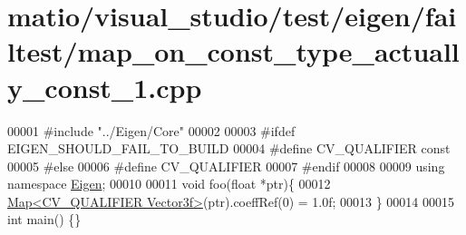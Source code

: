 \hypertarget{matio_2visual__studio_2test_2eigen_2failtest_2map__on__const__type__actually__const__1_8cpp_source}{}\section{matio/visual\+\_\+studio/test/eigen/failtest/map\+\_\+on\+\_\+const\+\_\+type\+\_\+actually\+\_\+const\+\_\+1.cpp}
\label{matio_2visual__studio_2test_2eigen_2failtest_2map__on__const__type__actually__const__1_8cpp_source}

\begin{DoxyCode}
00001 \textcolor{preprocessor}{#include "../Eigen/Core"}
00002 
00003 \textcolor{preprocessor}{#ifdef EIGEN\_SHOULD\_FAIL\_TO\_BUILD}
00004 \textcolor{preprocessor}{#define CV\_QUALIFIER const}
00005 \textcolor{preprocessor}{#else}
00006 \textcolor{preprocessor}{#define CV\_QUALIFIER}
00007 \textcolor{preprocessor}{#endif}
00008 
00009 \textcolor{keyword}{using namespace }\hyperlink{namespace_eigen}{Eigen};
00010 
00011 \textcolor{keywordtype}{void} foo(\textcolor{keywordtype}{float} *ptr)\{
00012     \hyperlink{group___core___module_class_eigen_1_1_map}{Map<CV\_QUALIFIER Vector3f>}(ptr).coeffRef(0) = 1.0f;
00013 \}
00014 
00015 \textcolor{keywordtype}{int} main() \{\}
\end{DoxyCode}

